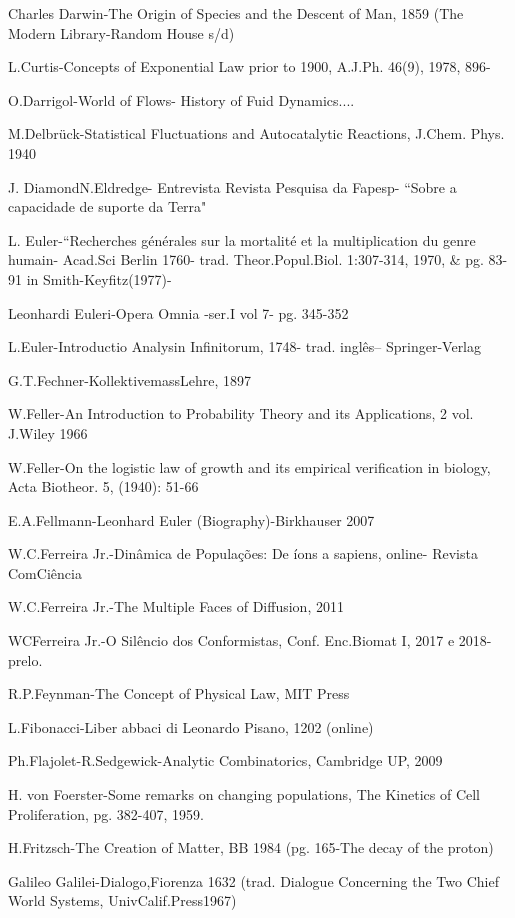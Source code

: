 Charles Darwin-The Origin of Species and the Descent of Man, 1859 (The Modern Library-Random House s/d)

L.Curtis-Concepts of Exponential Law prior to 1900, A.J.Ph. 46(9), 1978, 896-

O.Darrigol-World of Flows- History of Fuid Dynamics....

M.Delbrück-Statistical Fluctuations and Autocatalytic Reactions, J.Chem. Phys. 1940

J. DiamondN.Eldredge- Entrevista Revista Pesquisa da Fapesp- ``Sobre a capacidade de suporte da Terra"

L. Euler-``Recherches générales sur la mortalité et la multiplication du genre humain- Acad.Sci Berlin 1760- trad. Theor.Popul.Biol. 1:307-314, 1970, \& pg. 83-91 in Smith-Keyfitz(1977)-

Leonhardi Euleri-Opera Omnia -ser.I vol 7- pg. 345-352

L.Euler-Introductio Analysin Infinitorum, 1748- trad. inglês– Springer-Verlag

G.T.Fechner-KollektivemassLehre, 1897

W.Feller-An Introduction to Probability Theory and its Applications, 2 vol. J.Wiley 1966

W.Feller-On the logistic law of growth and its empirical verification in biology, Acta Biotheor. 5, (1940): 51-66

E.A.Fellmann-Leonhard Euler (Biography)-Birkhauser 2007

W.C.Ferreira Jr.-Dinâmica de Populações: De íons a sapiens, online- Revista ComCiência

W.C.Ferreira Jr.-The Multiple Faces of Diffusion, 2011

WCFerreira Jr.-O Silêncio dos Conformistas, Conf. Enc.Biomat I, 2017 e 2018-prelo.

R.P.Feynman-The Concept of Physical Law, MIT Press

L.Fibonacci-Liber abbaci di Leonardo Pisano, 1202 (online)

Ph.Flajolet-R.Sedgewick-Analytic Combinatorics, Cambridge UP, 2009

H. von Foerster-Some remarks on changing populations, The Kinetics of Cell Proliferation, pg. 382-407, 1959.

H.Fritzsch-The Creation of Matter, BB 1984 (pg. 165-The decay of the proton)

Galileo Galilei-Dialogo,Fiorenza 1632 (trad. Dialogue Concerning the Two Chief World Systems, UnivCalif.Press1967)

